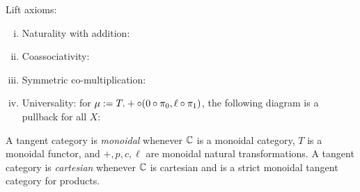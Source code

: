 \begin{definition}
\begin{enumerate}[{[TC.1]}]
\begin{enumerate}[(i)]
\begin{equation}
        \end{equation}
    \end{enumerate}
  \item Lift axioms:
    \begin{enumerate}[(i)]
        \item Naturality with addition:
        \begin{equation}
            \label{eq:tc-3-0}
            
        \end{equation}
        \item Coassociativity:
        \begin{equation}
            \label{eq:tc-3-1}
            
        \end{equation}
        \item Symmetric co-multiplication:
        \begin{equation}
            \label{eq:tc-3-2}
            
        \end{equation}
        \item Universality: for $\mu:= T.+ \circ (0\circ \pi_0, \ell \circ  \pi_1)$, the following diagram is a pullback for all $X$:
        \[\]
    \end{enumerate}
  \end{enumerate}
\end{definition}
\begin{definition}
    A tangent category is \textit{monoidal} whenever $\mathbb{C}$ is a monoidal category, $T$ is a monoidal functor, and $+,p,c,\ell$ are monoidal natural transformations. A tangent category is \textit{cartesian} whenever $\mathbb{C}$ is cartesian and is a strict monoidal tangent category for products.  
\end{definition}
